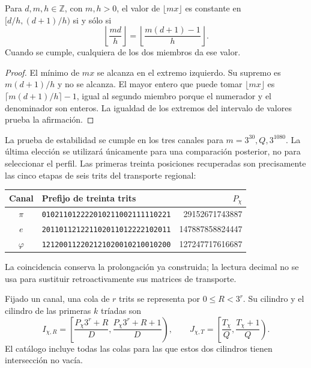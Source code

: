 \begin{lemma}
\label{act21:censo:estabilidad}
Para \(d,m,h\in\mathbb Z\), con \(m,h>0\), el valor de
\(\lfloor mx\rfloor\) es constante en \([d/h,(d+1)/h)\) si y sólo si
\begin{equation}
 \left\lfloor\frac{md}{h}\right\rfloor
 =\left\lfloor\frac{m(d+1)-1}{h}\right\rfloor.
 \label{act21:censo:prueba-estabilidad}
\end{equation}
Cuando se cumple, cualquiera de los dos miembros da ese valor.
\end{lemma}
\begin{proof}
El mínimo de \(mx\) se alcanza en el extremo izquierdo. Su supremo
es \(m(d+1)/h\) y no se alcanza. El mayor entero que puede tomar
\(\lfloor mx\rfloor\) es
\(\lceil m(d+1)/h\rceil-1\), igual al segundo miembro porque
el numerador y el denominador son enteros. La igualdad de los extremos
del intervalo de valores prueba la afirmación.
\end{proof}

La prueba de estabilidad se cumple en los tres canales para
\(m=3^{30},Q,3^{1080}\). La última elección se utilizará únicamente
para una comparación posterior, no para seleccionar el perfil. Las
primeras treinta posiciones recuperadas son precisamente las cinco
etapas de seis trits del transporte regional:
\begin{center}\small
\begin{tabular}{@{}c l r@{}}\toprule
Canal&Prefijo de treinta trits&\(P_\chi\)\\\midrule
\(\pi\)&\texttt{010211012222010211002111110221}&29152671743887\\
\(e\)&\texttt{201101121221102011012222102011}&147887858824447\\
\(\varphi\)&\texttt{121200112202121020010210010200}&127247717616687\\\bottomrule
\end{tabular}
\end{center}
La coincidencia conserva la prolongación ya construida; la lectura decimal
no se usa para sustituir retroactivamente sus matrices de transporte.

Fijado un canal, una cola de \(r\) trits se representa por
\(0\leq R<3^r\). Su cilindro y el cilindro de las primeras \(k\)
tríadas son
\begin{equation}
 I_{\chi,R}=\left[\frac{P_\chi3^r+R}{D},
                       \frac{P_\chi3^r+R+1}{D}\right),\qquad
 J_{\chi,T}=\left[\frac{T_\chi}{Q},\frac{T_\chi+1}{Q}\right).
 \label{act21:censo:dos-cilindros}
\end{equation}
El catálogo incluye todas las colas para las que estos dos cilindros
tienen intersección no vacía.

